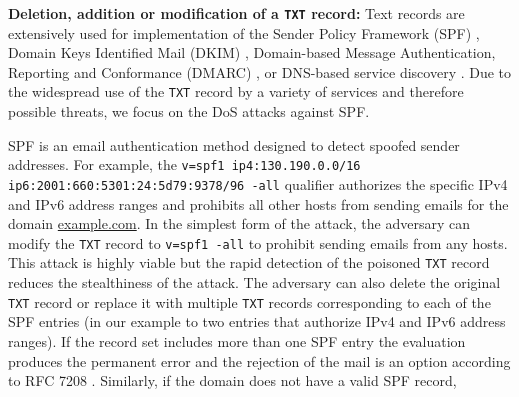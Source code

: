 \textbf{Deletion, addition or modification of a \texttt{TXT} record:} Text records are extensively used for implementation of the Sender Policy Framework (SPF) \cite{spf}, Domain Keys Identified Mail (DKIM) \cite{dkim}, Domain-based Message Authentication, Reporting and Conformance (DMARC) \cite{dmarc}, or DNS-based service discovery \cite{rfc6763}.
Due to the widespread use of the \texttt{TXT} record by a variety of services and therefore possible threats, we focus on the DoS attacks against SPF.

SPF is an email authentication method designed to detect spoofed sender addresses. %
For example, the %
\texttt{v=spf1 ip4:130.190.0.0/16} \texttt{ip6:2001:660:5301:24:5d79:9378/96 -all} qualifier %
authorizes the specific IPv4 and IPv6 address ranges 
and prohibits all other hosts from sending emails for the domain \url{example.com}.
%
In the simplest form of the attack, the adversary can modify the \texttt{TXT} record to \texttt{v=spf1 -all} to prohibit sending emails from any hosts. %
This attack is highly viable but the rapid detection of the poisoned \texttt{TXT} record reduces the stealthiness of the attack. %
The adversary can also delete the original \texttt{TXT} record or replace it with multiple \texttt{TXT} records corresponding to each of the SPF entries (in our example to two entries that authorize IPv4 and IPv6 address ranges). %
If the record set includes more than one SPF entry the evaluation produces the  permanent error and the rejection of the mail is an option according to RFC 7208 \cite{spf}.
%
%
%
%
Similarly, if the domain does not have a valid SPF record, %
